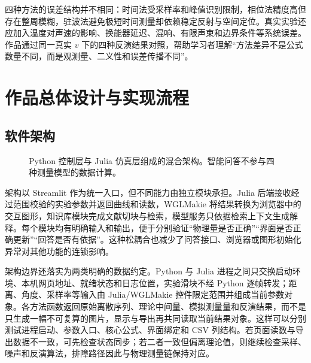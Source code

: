 \documentclass[UTF8,a4paper,zihao=-4]{ctexart}
\begin{document}
四种方法的误差结构并不相同：时间法受采样率和峰值识别限制，相位法精度高但存在整周模糊，驻波法避免极短时间测量却依赖稳定反射与空间定位。真实实验还应加入温度对声速的影响、换能器延迟、混响、有限声束和边界条件等系统误差。作品通过同一真实 $v$ 下的四种反演结果对照，帮助学习者理解“方法差异不是公式数量不同，而是观测量、二义性和误差传播不同”。

\section{作品总体设计与实现流程}

\subsection{软件架构}
\begin{figure}[!htb]
\centering
{}
\caption{Python 控制层与 Julia 仿真层组成的混合架构。智能问答不参与四种测量模型的数据计算。}
\end{figure}

架构以 Streamlit 作为统一入口，但不同能力由独立模块承担。Julia 后端接收经过范围校验的实验参数并返回曲线和读数，WGLMakie 将结果转换为浏览器中的交互图形，知识库模块完成文献切块与检索，模型服务只依据检索上下文生成解释。每个模块均有明确输入和输出，便于分别验证“物理量是否正确”“界面是否正确更新”“回答是否有依据”。这种松耦合也减少了问答接口、浏览器或图形初始化异常对其他功能的连锁影响。

架构边界还落实为两类明确的数据约定。Python 与 Julia 进程之间只交换启动环境、本机网页地址、就绪状态和日志位置，实验滑块不经 Python 逐帧转发；距离、角度、采样率等输入由 Julia/WGLMakie 控件限定范围并组成当前参数对象。各方法函数返回原始离散序列、理论中间量、模拟测量量和反演结果，而不是只生成一幅不可复算的图片，显示与导出再共同读取当前结果对象。这样可以分别测试进程启动、参数入口、核心公式、界面绑定和 CSV 列结构。若页面读数与导出数据不一致，可先检查状态同步；若二者一致但偏离理论值，则继续检查采样、噪声和反演算法，排障路径因此与物理测量链保持对应。
\end{document}
